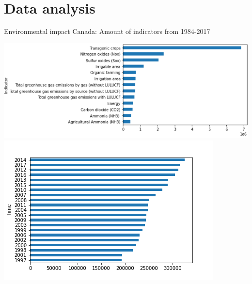 \documentclass[t,9pt,aspectratio=169]{beamer}
\begin{document}
\section{Data analysis}
\begin{frame}{Environmental impact Canada: Amount of indicators from 1984-2017 }

\begin{center}
\includegraphics[scale=0.31]{./figures/Indicator_Value}  \includegraphics[scale=0.33]{./figures/Time_Value}
\end{center}
\end{frame} 
\end{document}
